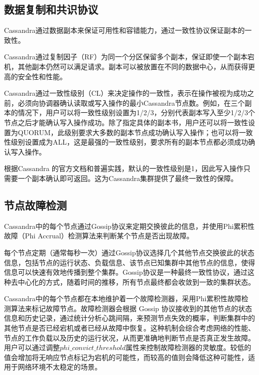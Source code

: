 \subsection{数据复制和共识协议}



Cassandra通过数据副本来保证可用性和容错能力，通过一致性协议保证副本的一致性。

Cassandra通过复制因子（RF）为同一个分区保留多个副本，保证即使一个副本宕机，其他副本仍然可以满足请求。副本可以被放置在不同的数据中心，从而获得更高的安全性和性能。

Cassandra通过一致性级别（CL）来决定操作的一致性，表示在操作被视为成功之前，必须向协调器确认读取或写入操作的最小Cassandra节点数。例如，在三个副本的情况下，用户可以将一致性级别设置为1/2/3，分别代表副本写入至少1/2/3个节点之后才能确认写入操作成功。除了指定具体的副本书，用户还可以将一致性设置为QUORUM，此级别要求大多数的副本节点成功确认写入操作；也可以将一致性级别设置成为ALL，这是最强的一致性级别，要求所有的副本节点都必须成功确认写入操作。

根据Cassandra 的官方文档和普遍实践，默认的一致性级别是1，因此写入操作只需要一个副本确认即可返回。这为Cassandra集群提供了最终一致性的保障。

\subsection{节点故障检测}\label{sec:cassandra-failure-detecttion}

Cassandra中的每个节点通过Gossip协议来定期交换彼此的信息，并使用Phi累积性故障（Phi Accrual）检测算法\cite{hayashibara2004spl}来判断某个节点是否出现故障。

每个节点定期（通常每秒一次）通过Gossip协议选择几个其他节点交换彼此的状态信息，包括节点的运行状态、负载信息、该节点已知集群中其他节点的信息，使得信息可以快速有效地传播到整个集群。Gossip协议是一种最终一致性协议，通过这种去中心化的方式，随着时间的推移，所有节点最终都会收敛到一致的集群状态。

Cassandra中的每个节点都在本地维护着一个故障检测器，采用Phi累积性故障检测算法来标记故障节点。故障检测器会根据 Gossip 协议接收到的其他节点的状态信息和历史记录，通过统计分析心跳间隔，来预测节点失效的概率，判断集群中的其他节点是否已经宕机或者已经从故障中恢复。这种机制会综合考虑网络的性能、节点的工作负载以及历史的运行状况，从而更准确地判断节点是否真正发生故障。用户可以通过调整$phi\_convict\_threshold$属性来控制故障检测器的灵敏度。较低的值会增加将无响应节点标记为宕机的可能性，而较高的值则会降低这种可能性，适用于网络环境不太稳定的场景。



